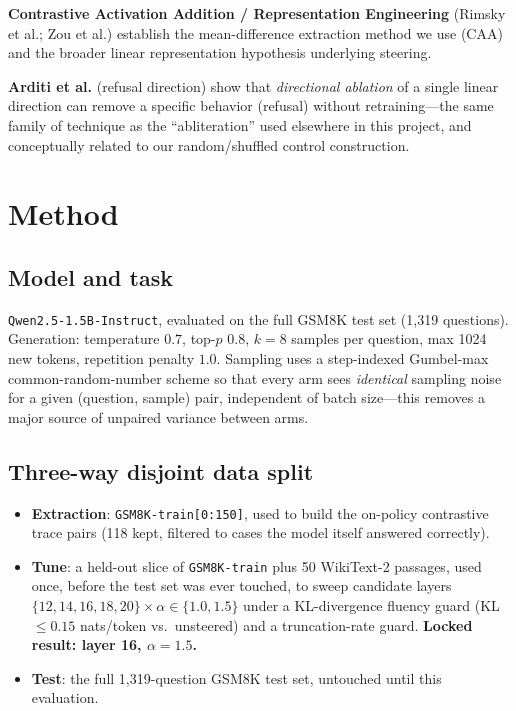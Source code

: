 \documentclass[11pt]{article}
\begin{document}
\textbf{Contrastive Activation Addition / Representation Engineering} (Rimsky et al.; Zou et al.)
establish the mean-difference extraction method we use (CAA) and the broader linear
representation hypothesis underlying steering.

\textbf{Arditi et al.} (refusal direction) show that \emph{directional ablation} of a single
linear direction can remove a specific behavior (refusal) without retraining---the same family of
technique as the ``abliteration'' used elsewhere in this project, and conceptually related to our
random/shuffled control construction.

\section{Method}

\subsection{Model and task}
\texttt{Qwen2.5-1.5B-Instruct}, evaluated on the full GSM8K test set (1{,}319 questions).
Generation: temperature $0.7$, top-$p$ $0.8$, $k=8$ samples per question, max 1024 new tokens,
repetition penalty $1.0$. Sampling uses a step-indexed Gumbel-max common-random-number scheme so
that every arm sees \emph{identical} sampling noise for a given (question, sample) pair,
independent of batch size---this removes a major source of unpaired variance between arms.

\subsection{Three-way disjoint data split}
\begin{itemize}
  \item \textbf{Extraction}: \texttt{GSM8K-train[0:150]}, used to build the on-policy contrastive
    trace pairs (118 kept, filtered to cases the model itself answered correctly).
  \item \textbf{Tune}: a held-out slice of \texttt{GSM8K-train} plus 50 WikiText-2 passages, used
    once, before the test set was ever touched, to sweep candidate layers $\{12,14,16,18,20\}
    \times \alpha \in \{1.0, 1.5\}$ under a KL-divergence fluency guard (KL $\le 0.15$
    nats/token vs.\ unsteered) and a truncation-rate guard. \textbf{Locked result: layer 16,
    $\alpha = 1.5$.}
  \item \textbf{Test}: the full 1{,}319-question GSM8K test set, untouched until this evaluation.
\end{itemize}
\end{document}

